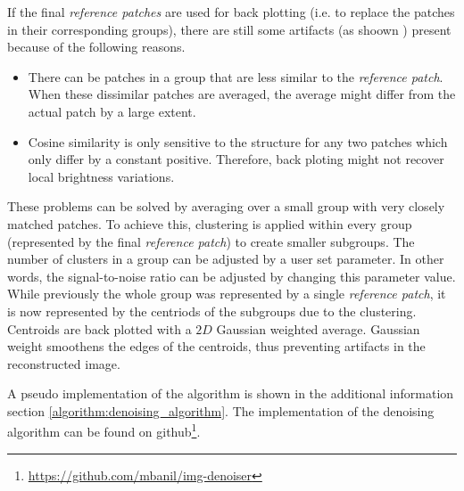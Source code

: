 \documentclass[fleqn,10pt]{wlscirep}
\begin{document}
If the final \textit{reference patches} are used for back plotting (i.e. to replace the patches in their corresponding groups), there are still some artifacts (as shoown ) present because of the following reasons. 


\begin{itemize}
	\item There can be patches in a group that are less similar to the \textit{reference patch}. When these dissimilar patches are averaged, the average might differ from the actual patch by a large extent. 
	\item Cosine similarity is only sensitive to the structure for any two patches which only differ by a constant positive. Therefore, back ploting might not recover local brightness variations.
\end{itemize}

These problems can be solved by averaging over a small group with very closely matched patches. To achieve this, clustering is applied within every group (represented by the final \textit{reference patch}) to create smaller subgroups. The number of clusters in a group can be adjusted by a user set parameter. In other words, the signal-to-noise ratio can be adjusted by changing this parameter value. While previously the whole group was represented by a single \textit{reference patch}, it is now represented by the centriods of the subgroups due to the clustering. Centroids are back plotted with a $2D$ Gaussian weighted average. Gaussian weight smoothens the edges of the centroids, thus preventing artifacts in the reconstructed image. 

A pseudo implementation of the algorithm is shown in the additional information section \ref{algorithm:denoising_algorithm}. The implementation of the denoising algorithm can be found on github\footnote{\url{https://github.com/mbanil/img-denoiser}}.
\end{document}
